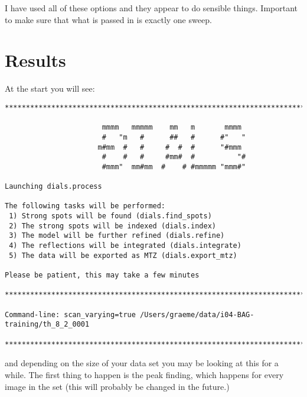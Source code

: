 \documentclass[a4paper, 11pt]{article}
\begin{document}
\noindent
I have used all of these options and they appear to do sensible things. Important to make sure that what is passed in is exactly one sweep.

\section{Results}

At the start you will see:

{\small
\begin{verbatim}
********************************************************************************

                       mmmm   mmmmm    mm   m       mmmm            
                       #   "m   #      ##   #      #"   "           
                      m#mm  #   #     #  #  #      "#mmm            
                       #    #   #     #mm#  #          "#           
                       #mmm"  mm#mm  #    # #mmmmm "mmm#"           

Launching dials.process

The following tasks will be performed:
 1) Strong spots will be found (dials.find_spots)
 2) The strong spots will be indexed (dials.index)
 3) The model will be further refined (dials.refine)
 4) The reflections will be integrated (dials.integrate)
 5) The data will be exported as MTZ (dials.export_mtz)

Please be patient, this may take a few minutes

********************************************************************************

Command-line: scan_varying=true /Users/graeme/data/i04-BAG-training/th_8_2_0001

********************************************************************************
\end{verbatim}
}

\noindent
and depending on the size of your data set you may be looking at this
for a while. The first thing to happen is the peak finding, which
happens for every image in the set (this will probably be changed in
the future.)
\end{document}
